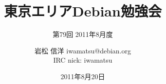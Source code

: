 




\documentclass[cjk,dvipdfmx,12pt]{beamer}
\usepackage{monthlypresentation}



\title{東京エリアDebian勉強会}
\subtitle{第79回 2011年8月度}
\author{岩松 信洋 iwamatsu@debian.org\\IRC nick: iwamatsu}
\date{2011年8月20日}



